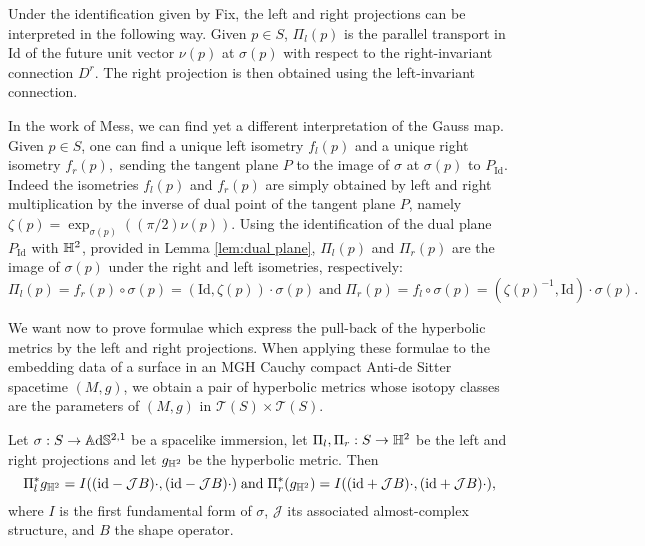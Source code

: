 \begin{observation}
    Under the identification given by Fix, the left and right projections can be interpreted in the following way. Given $p\in S$, $\Pi_l(p)$ is the parallel transport in Id of the future unit vector $\nu(p)$ at $\sigma(p)$ with respect to the right-invariant connection $D^r$. The right projection is then obtained using the left-invariant connection. 
\end{observation}


\begin{observation}\label{DiafGauss}
    In the work of Mess, we can find yet a different interpretation of the Gauss map. Given $p\in S$, one can find a unique left isometry $f_l(p)$ and a unique right isometry $f_r(p),$ sending the tangent plane $P$ to the image of $\sigma$ at $\sigma(p)$ to $P_{\text{Id}}$. Indeed the isometries $f_l(p)$ and $f_r(p)$ are simply obtained by left and right multiplication by the inverse of dual point of the tangent plane $P$, namely $\zeta(p)=\exp_{\sigma(p)}((\pi/2)\nu(p))$. Using the identification of the dual plane $P_{\text{Id}}$ with $\mathbb{H}^2$, provided in Lemma \ref{lem:dual plane}, $\Pi_l(p)$ and $\Pi_r(p)$ are the image of $\sigma(p)$ under the right and left isometries, respectively:
    \[
        \Pi_l(p)=f_r(p)\circ\sigma(p)=(\text{Id},\zeta(p))\cdot \sigma(p)\;\text{and}\;\Pi_r(p)=f_l\circ\sigma(p)=(\zeta(p)^{-1},\text{Id})\cdot\sigma(p).
    \]
\end{observation}


We want now to prove formulae which express the pull-back of the hyperbolic metrics by the left and right projections. When applying these formulae to the embedding data of a surface in an MGH Cauchy compact Anti-de Sitter spacetime $(M,g)$, we obtain a pair of hyperbolic metrics whose isotopy classes are the parameters of $(M,g)$
in $\mathcal{T}(S)\times\mathcal{T}(S).$

\begin{proposition}\label{prop:left right pull-back metric}
    Let $\sigma:S\to\mathbb{A}\mathrm{d}\mathbb{S}^{2,1}$ be a spacelike immersion, let $\Pi_l,\Pi_r:S\to\mathbb{H}^2$ be the left and right projections and let $g_{\mathbb{H}^2}$ be the hyperbolic metric. Then 
    \begin{equation}
        \Pi_l^*g_{\mathbb{H}^2}=I((\text{id}-\mathcal{J}B)\cdot,(\text{id}-\mathcal{J}B)\cdot)\;\text{and}\;\Pi_r^*(g_{\mathbb{H}^2})=I((\text{id}+\mathcal{J}B)\cdot,(\text{id}+\mathcal{J}B)\cdot),
    \end{equation}
    where $I$ is the first fundamental form of $\sigma$, $\mathcal{J}$ its associated almost-complex structure, and $B$ the shape operator.
\end{proposition}

